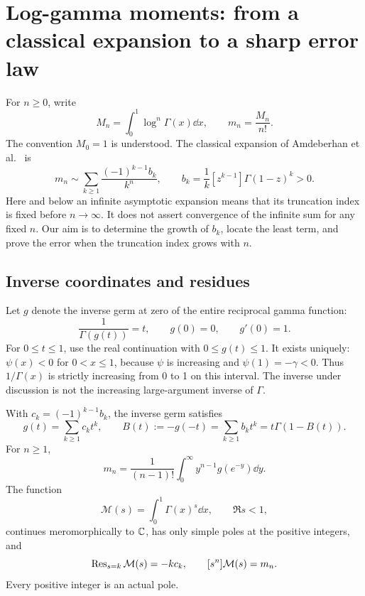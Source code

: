 \section{Log-gamma moments: from a classical expansion to a sharp error law}
\label{sec:moments}

For \(n\geq 0\), write
\[
 M_n=\int_0^1\log^n\Gamma(x)\dd x,\qquad m_n=\frac{M_n}{n!}.
\]
The convention \(M_0=1\) is understood. The classical expansion of
Amdeberhan et al.~\cite{ACEMKM} is
\begin{equation}\label{eq:classical-moment}
 m_n\sim\sum_{k\geq1}\frac{(-1)^{k-1}b_k}{k^n},\qquad
 b_k=\frac1k[z^{k-1}]\Gamma(1-z)^k>0.
\end{equation}
Here and below an infinite asymptotic expansion means that its truncation
index is fixed before \(n\to\infty\). It does not assert convergence of the
infinite sum for any fixed \(n\). Our aim is to determine the growth of
\(b_k\), locate the least term, and prove the error when the truncation
index grows with \(n\).

\subsection{Inverse coordinates and residues}

Let \(g\) denote the inverse germ at zero of the entire reciprocal gamma
function:
\[
 \frac1{\Gamma(g(t))}=t,\qquad g(0)=0,\qquad g'(0)=1.
\]
For \(0\leq t\leq1\), use the real continuation with \(0\leq g(t)\leq1\).
It exists uniquely: \(\psi(x)<0\) for \(0<x\leq1\), because
\(\psi\) is increasing and \(\psi(1)=-\gamma<0\).
Thus \(1/\Gamma(x)\) is strictly increasing from 0 to 1 on this interval.
The inverse under discussion is not the increasing large-argument inverse
of \(\Gamma\).

\begin{proposition}\label{prop:inverse}
With \(c_k=(-1)^{k-1}b_k\), the inverse germ satisfies
\begin{equation}\label{eq:g-series}
 g(t)=\sum_{k\geq1}c_kt^k,\qquad
 B(t):=-g(-t)=\sum_{k\geq1}b_kt^k=t\Gamma(1-B(t)).
\end{equation}
For \(n\geq1\),
\begin{equation}\label{eq:layercake}
 m_n=\frac1{(n-1)!}\int_0^\infty y^{n-1}g(e^{-y})\dd y.
\end{equation}
The function
\[
 \mathcal M(s)=\int_0^1\Gamma(x)^s\dd x,\qquad \Re s<1,
\]
continues meromorphically to \(\mathbb C\), has only simple poles at the
positive integers, and
\begin{equation}\label{eq:mgf-res}
 \operatorname{Res}_{s=k}\mathcal M(s)=-k c_k,\qquad
 [s^n]\mathcal M(s)=m_n.
\end{equation}
Every positive integer is an actual pole.
\end{proposition}


